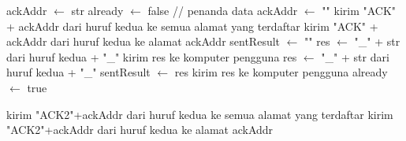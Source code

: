 \begin{itemize}
\begin{algorithm}[H]
\begin{algorithmic}
						\State ackAddr $\leftarrow$ str 					
					\EndIf
							\State already $\leftarrow$ false // penanda data
							\State ackAddr $\leftarrow$ ""
						\Else 
								\State kirim "ACK" + ackAddr dari huruf kedua ke semua alamat yang terdaftar
							\Else
							 	\State kirim "ACK" + ackAddr dari huruf kedua ke alamat ackAddr
							\EndIf
							\State sentResult $\leftarrow$ ""						
						\EndIf					
					\EndIf  
				\Else
						\State res $\leftarrow$ "\_" + str dari huruf kedua + "\_"  		
						\try
    						\State kirim res ke komputer pengguna
    					\endtry
    				\EndIf
						\State res $\leftarrow$ "\_" + str dari huruf kedua + "\_"
							\State sentResult $\leftarrow$ res
							\try
    							\State kirim res ke komputer pengguna
    						\endtry
    						\State already $\leftarrow$ true
						\EndIf    				
    				\EndIf
{}
\end{algorithmic}
\end{algorithm}

\begin{algorithm}[H]
\begin{algorithmic}
							\State kirim "ACK2"+ackAddr dari huruf kedua ke semua alamat yang terdaftar
						\Else
							\State kirim "ACK2"+ackAddr dari huruf kedua ke alamat ackAddr
						\EndIf    				
    				\EndIf
    			\EndIf
    		\endtry
		\EndFunction
	\end{algorithmic}
	\end{algorithm}
	

\end{itemize}
